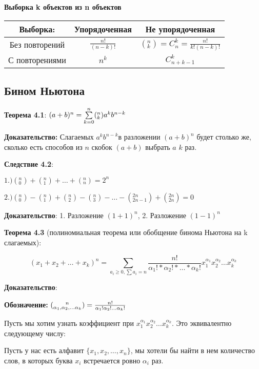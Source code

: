 \documentclass[openany]{article}
\begin{document}
   \textbf{Выборка k объектов из n объектов}

    \begin{tabular}{|c|c|c|}
        \hline
        Выборка: & Упорядоченная & Не упорядоченная \\
        \hline
        Без повторений & $\frac{n!}{(n-k)!}$ & $({}^n_k) = C_n^k = \frac{n!}{k!(n-k)!}$ \\
        \hline
        С повторениями & $n^k$ & $C_{n+k-1}^k$ \\
        \hline
    \end{tabular}

   \subsection{Бином Ньютона}

   \textbf{Теорема 4.1}: $(a + b)^n = \Sum{k=0}{n}({}^n_k)a^kb^{n-k}$

   \textbf{Доказательство:} Слагаемых $a^kb^{n-k} $в разложении $(a + b)^n$ будет столько же, сколько есть способов из $n$ скобок $(a + b)$ выбрать $a$ $k$ раз.

   \textbf{Следствие 4.2}:

   $1.) ({}_0^n) + ({}_1^n) + \ldots + ({}_n^n) = 2^n$

   $2.) ({}_0^n) - ({}_1^n) + ({}_2^n) - ({}_3^n) - \ldots - ({}_{2n-1}^{2n}) + ({}_{2n}^{2n}) = 0$ 

   \textbf{Доказательство}: 1. Разложение $(1 + 1)^n$, 2. Разложение $(1 - 1)^n$

   \textbf{Теорема 4.3} (полиномиальная теорема или обобщение бинома Ньютона на k слагаемых):

   $$(x_1 + x_2 + \ldots + x_k)^n = \sum\limits_{a_i \ge 0, \sum a_i = n} \frac{n!}{\alpha_1! * \alpha_2! * \ldots * \alpha_k!}x_1^{\alpha_1}x_2^{\alpha_2}\ldots x_k^{\alpha_k}$$

   \textbf{Доказательство}:

   \textbf{Обозначение:} $({}^{\hspace{0.6cm}n}_{\alpha_1, \alpha_2, \ldots \alpha_k}) = \frac{n!}{\alpha_1! \alpha_2! \ldots \alpha_k!}$

   Пусть мы хотим узнать коэффициент при $x_1^{\alpha_1}x_2^{\alpha_2}\ldots x_k^{\alpha_k}$. Это эквивалентно следующему числу:

   Пусть у нас есть алфавит $\{x_1, x_2, \ldots, x_n\}$, мы хотели бы найти в нем количество слов, в которых буква $x_i$ встречается ровно $\alpha_i$ раз.
\end{document}
